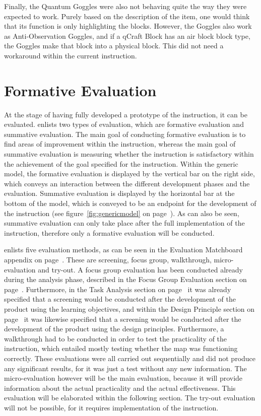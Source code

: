 \documentclass[11pt,twoside]{report} %
\begin{document}
Finally, the Quantum Goggles were also not behaving quite the way they were expected to work. Purely based on the description of the item, one would think that its function is only highlighting the blocks. However, the Goggles also work as Anti-Observation Goggles, and if a qCraft Block has an air block block type, the Goggles make that block into a physical block. This did not need a workaround within the current instruction.


\part{Formative Evaluation}
\thispagestyle{fancy}

At the stage of having fully developed a prototype of the instruction, it can be evaluated.  enlists two types of evaluation, which are formative evaluation and summative evaluation. The main goal of conducting formative evaluation is to find areas of improvement within the instruction, whereas the main goal of summative evaluation is measuring whether the instruction is satisfactory within the achievement of the goal specified for the instruction. Within the generic model, the formative evaluation is displayed by the vertical bar on the right side, which conveys an interaction between the different development phases and the evaluation. Summative evaluation is displayed by the horizontal bar at the bottom of the model, which is conveyed to be an endpoint for the development of the instruction (see figure~\ref{fig:genericmodel} on page~\pageref{fig:genericmodel}). As can also be seen, summative evaluation can only take place after the full implementation of the instruction, therefore only a formative evaluation will be conducted.

 enlists five evaluation methods, as can be seen in the Evaluation Matchboard appendix on page~\pageref{app:evamatchboard}. These are screening, focus group, walkthrough, micro-evaluation and try-out. A focus group evaluation has been conducted already during the analysis phase, described in the Focus Group Evaluation section on page~\pageref{ch:focusgroup}. Furthermore, in the Task Analysis section on page~\pageref{subch:testspecifications} it was already specified that a screening would be conducted after the development of the product using the learning objectives, and within the Design Principle section on page~\pageref{ch:designprinciples} it was likewise specified that a screening would be conducted after the development of the product using the design principles. Furthermore, a walkthrough had to be conducted in order to test the practicality of the instruction, which entailed mostly testing whether the map was functioning correctly. These evaluations were all carried out sequentially and did not produce any significant results, for it was just a test without any new information. The micro-evaluation however will be the main evaluation, because it will provide information about the actual practicality and the actual effectiveness. This evaluation will be elaborated within the following section. The try-out evaluation will not be possible, for it requires implementation of the instruction.
\end{document}
